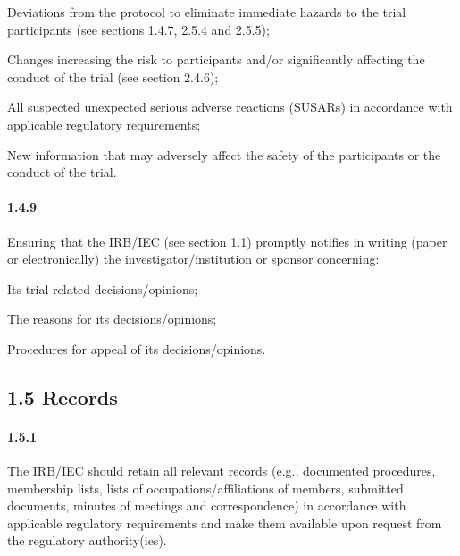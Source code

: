 \documentclass[11pt]{article}
\begin{document}
\begin{description}[leftmargin=2.5cm,style=sameline]

\item[(a)] Deviations from the protocol to eliminate immediate hazards to the trial participants (see sections 1.4.7, 2.5.4 and 2.5.5);

\item[(b)] Changes increasing the risk to participants and/or significantly affecting the conduct of the trial (see section 2.4.6);

\item[(c)] All suspected unexpected serious adverse reactions (SUSARs) in accordance with applicable regulatory requirements;

\item[(d)] New information that may adversely affect the safety of the participants or the conduct of the trial.

\end{description}

\paragraph{1.4.9} Ensuring that the IRB/IEC (see section 1.1) promptly notifies in writing (paper or electronically) the investigator/institution or sponsor concerning:

\begin{description}[leftmargin=2.5cm,style=sameline]

\item[(a)] Its trial-related decisions/opinions;

\item[(b)] The reasons for its decisions/opinions;

\item[(c)] Procedures for appeal of its decisions/opinions.

\end{description}

\subsection{1.5 Records}

\paragraph{1.5.1} The IRB/IEC should retain all relevant records (e.g., documented procedures, membership lists, lists of occupations/affiliations of members, submitted documents, minutes of meetings and correspondence) in accordance with applicable regulatory requirements and make them available upon request from the regulatory authority(ies).
\end{document}
